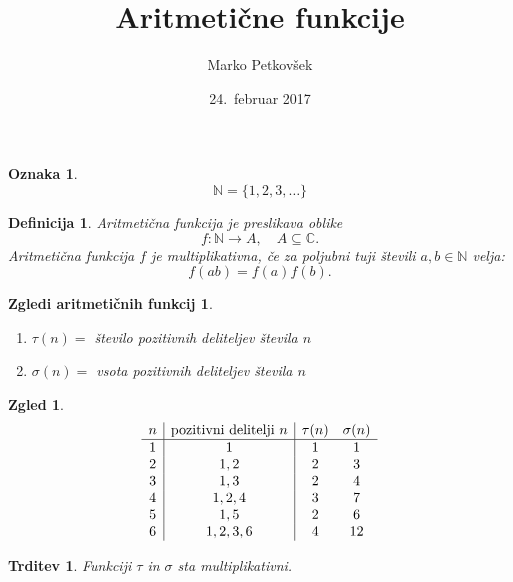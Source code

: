 \documentclass{beamer}
\title{Aritmetične funkcije}
\author{Marko Petkovšek}
\institute{Fakulteta za matematiko in fiziko \\
Oddelek za matematiko}
\date{24.\ februar 2017}
\def\N{\mathbb{N}} %
\def\C{\mathbb{C}} %
\newtheorem{trditev}{Trditev}
\newtheorem{definicija}{Definicija}
\newtheorem{zgled}{Zgled}
\newtheorem{zglediaf}{Zgledi aritmetičnih funkcij}
\newtheorem{oznaka}{Oznaka}
\begin{document}

\begin{frame}
\titlepage
\end{frame}


\begin{frame}

\begin{oznaka}
\[
\N = \{1,2,3,\ldots\}
\]
\end{oznaka}

\pause
\medskip
\begin{definicija}
\alert{Aritmetična funkcija} je preslikava oblike
\[
f: \N \to A, \quad A \subseteq \C.
\]
\pause
Aritmetična funkcija $f$ je \alert{multiplikativna}, če za poljubni tuji števili $a, b \in \N$ velja:
\[
f(ab) = f(a)f(b).
\]
\end{definicija}

\end{frame}


\begin{frame}

\begin{zglediaf}
\begin{enumerate}
\item $\tau(n) = $ število pozitivnih deliteljev števila $n$
\pause
\item $\sigma(n) = $ vsota pozitivnih deliteljev števila $n$
\end{enumerate}
\end{zglediaf}

\pause
\medskip
\begin{zgled}
\[
\begin{array}{c|c|cc}
n & {\rm pozitivni\ delitelji\ } n & \tau(n) & \sigma(n) \\
\hline
1 & 1 & 1 & 1 \\
2 & 1,2 & 2 & 3 \\
3 & 1,3 & 2 & 4 \\
4 & 1,2,4 & 3 & 7 \\
5 & 1,5 & 2 & 6 \\
6 & 1,2,3,6 & 4 & 12
\end{array}
\]
\end{zgled}

\pause
\medskip
\begin{trditev}
Funkciji $\tau$ in $\sigma$ sta multiplikativni.
\end{trditev}

\end{frame}
\end{document}
